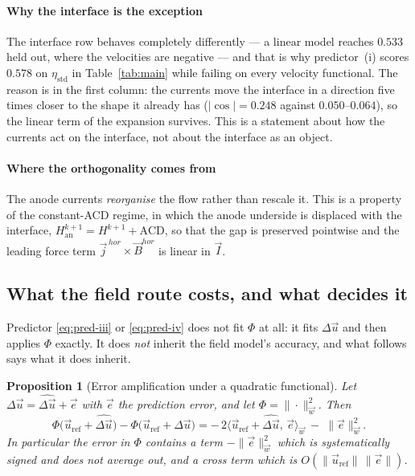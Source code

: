 \documentclass[11pt,a4paper]{article}
\theoremstyle{plain}
\newtheorem{proposition}{Proposition}
\theoremstyle{definition}
\theoremstyle{remark}
\begin{document}
\label{rem:interface-linear}
\paragraph{Why the interface is the exception}
The interface row behaves completely differently --- a linear model reaches
$0.533$ held out, where the velocities are negative --- and that is why
predictor~(i) scores $0.578$ on $\eta_{\mathrm{std}}$ in
Table~\ref{tab:main} while failing on every velocity functional. The reason is
in the first column: the currents move the interface in a direction five times
closer to the shape it already has ($|\cos| = 0.248$ against $0.050$--$0.064$),
so the linear term of the expansion survives. This is a statement about how the
currents act on the interface, not about the interface as an object.

\paragraph{Where the orthogonality comes from}
The anode currents \emph{reorganise} the flow rather than rescale it. This is a
property of the constant-ACD regime, in which the anode underside is displaced
with the interface, $H_{\mathrm{an}}^{k+1} = H^{k+1}+\mathrm{ACD}$, so that the
gap is preserved pointwise and the leading force term
$\vec{j}^{\,hor}\times\vec{B}^{hor}$ is linear in $\vec{I}$.

\subsection{What the field route costs, and what decides it}
\label{sec:why-works}

Predictor \eqref{eq:pred-iii} or \eqref{eq:pred-iv} does not fit $\Phi$ at all:
it fits $\Delta\vec{u}$ and then applies $\Phi$ exactly. It does \emph{not}
inherit the field model's accuracy, and what follows says what it does inherit.

\begin{proposition}[Error amplification under a quadratic functional]
\label{prop:amplification}
Let $\Delta\vec{u} = \widehat{\Delta\vec{u}} + \vec{e}$ with $\vec{e}$ the
prediction error, and let $\Phi = \|\cdot\|^2_{\vec{w}}$. Then
\begin{equation}
\label{eq:amplification}
\Phi\bigl(\vec{u}_{\mathrm{ref}}+\widehat{\Delta\vec{u}}\bigr)
- \Phi\bigl(\vec{u}_{\mathrm{ref}}+\Delta\vec{u}\bigr)
= -\,2\bigl\langle \vec{u}_{\mathrm{ref}} + \widehat{\Delta\vec{u}},\,\vec{e}\bigr\rangle_{\vec{w}}
\;-\; \|\vec{e}\|^2_{\vec{w}} .
\end{equation}
In particular the error in $\Phi$ contains a term $-\|\vec{e}\|^2_{\vec{w}}$
which is \emph{systematically signed} and does not average out, and a cross term
which is $O(\|\vec{u}_{\mathrm{ref}}\|\,\|\vec{e}\|)$.
\end{proposition}
\end{document}
